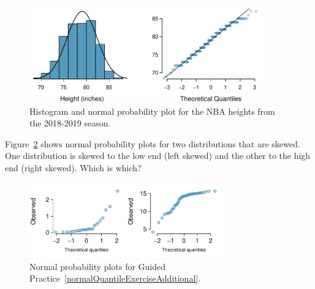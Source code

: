 \begin{figure}
\centering
\includegraphics[width=0.9\textwidth]{ch_distributions/figures/nbaNormal/nbaNormal}
\caption{Histogram and normal probability plot for the NBA heights from the 2018-2019 season.}
\label{nbaNormal}
\end{figure}


\begin{exercisewrap}
\begin{nexercise} \label{normalQuantileExerciseAdditional}
Figure~\ref{normalQuantileExerAdditional} shows normal probability plots for two distributions that are skewed. One distribution is skewed to the low end (left skewed) and the other to the high end (right skewed). Which is which?\footnotemark
\end{nexercise}
\end{exercisewrap}

\begin{figure}[h]
\centering
\includegraphics[width=0.75\textwidth]{ch_distributions/figures/normalQuantileExer/normalQuantileExerAdditional}
\caption{Normal probability plots for Guided Practice~\ref{normalQuantileExerciseAdditional}.}
\label{normalQuantileExerAdditional}
\end{figure}



\B{\newpage}
